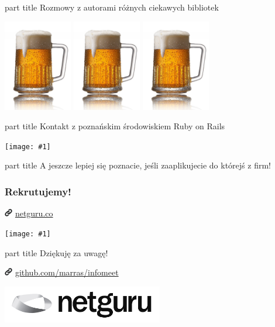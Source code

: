 \documentclass{beamer}
\newcommand{\myfullimage}[1]{%
    \hspace*{-1.1cm}
    \texttt{[image: \#1]}
}
\newcommand{\myurl}[1]{%
    \begin{block}{}
       \centering \huge
       \includegraphics[width=0.35cm]{link.png}
       \hspace{0.1cm}
       \url{#1}
    \end{block}
}
\newcommand{\mybox}[1]{%
    \begin{centering}
    \vspace{1em}\par
        \begin{beamercolorbox}[rounded=true,sep=4pt,center]{part title}
           \huge #1
        \end{beamercolorbox}
    \end{centering}
}
\newcommand{\mytitle}[1]{%
    \begin{frame}[plain]
        \mybox{#1}
    \end{frame}
}
\begin{document}
\begin{frame}[plain]
\mybox{Rozmowy z autorami różnych ciekawych bibliotek}
\vspace{0.5cm}
\hspace{1cm}\includegraphics[width=3cm]{piwo.png}
\includegraphics[width=3cm]{piwo.png}
\includegraphics[width=3cm]{piwo.png}
\end{frame}

\begin{frame}[plain]
\mybox{Kontakt z poznańskim środowiskiem Ruby on Rails}
\vspace{0.5cm}
\myfullimage{netgurale.jpg}
\end{frame}

\mytitle{A jeszcze lepiej się poznacie, jeśli zaaplikujecie do którejś z firm!}

\begin{frame}[fragile]
\frametitle{Rekrutujemy!}
\myurl{netguru.co}
\myfullimage{rekrutacja.png}
\end{frame}

\begin{frame}[plain]
\begin{centering}
    \vspace{1em}\par
        \begin{beamercolorbox}[rounded=true,sep=4pt,center]{part title}
           \huge Dziękuję za uwagę!
        \end{beamercolorbox}
    \vspace{0.5cm}
    \myurl{github.com/marras/infomeet}
    \vspace{1.5cm}
    \includegraphics[width=7cm]{netguru_logo.jpg} \par
\end{centering}
\end{frame}
\end{document}
